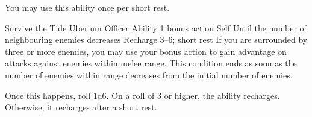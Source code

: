 You may use this ability once per short rest.


\ability%
    {Survive the Tide}
    {Uberium Officer Ability}
    {1 bonus action}
    {Self}
    {Until the number of neighbouring enemies decreases}
    {Recharge 3--6; short rest}
If you are surrounded by three or more enemies,
you may use your bonus action to gain advantage on attacks
against enemies within melee range.
This condition ends as soon as the number of enemies
within range decreases from the initial number of enemies.

Once this happens, roll 1d6.
On a roll of 3 or higher, 
the ability recharges.
Otherwise, it recharges after a short rest.


